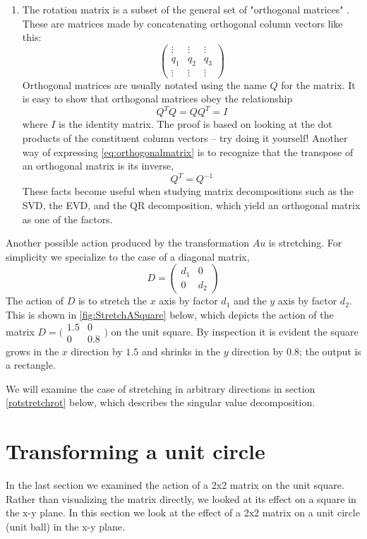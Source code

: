 \documentclass[onefignum,onetabnum]{siamart190516}
\begin{document}
\begin{enumerate}
	\item
	The rotation matrix is a subset of the general set of "orthogonal matrices" \cite{higham2020_OrthoMatrix}.  These
	are matrices made by concatenating orthogonal column vectors like this:
	$$
	\begin{pmatrix}
	\vdots & \vdots & \vdots \\
	q_1 & q_2 & q_3 \\
	\vdots & \vdots & \vdots
	\end{pmatrix}
	$$
	Orthogonal matrices are usually
	notated using the name $Q$ for the matrix.  It is easy to show that orthogonal matrices
	obey the relationship
	\begin{equation}
	Q^T Q = Q Q^T = I
	\label{eq:orthogonalmatrix}
	\end{equation}
	where $I$ is the identity matrix.  The proof is based on looking at the dot products
	of the constituent column vectors -- try doing it yourself!  
	Another way of expressing \cref{eq:orthogonalmatrix} is to recognize that the
	transpose of an orthogonal matrix is its inverse,
	$$
	Q^T = Q^{-1}
	$$
	These facts become useful when studying matrix decompositions such as the SVD, the EVD,
	and the QR decomposition, which yield an orthogonal matrix as one of the factors.
\end{enumerate}

Another possible action produced by the transformation $A u$ is stretching.
For simplicity we specialize to the case of a diagonal matrix,
\begin{equation}
D = 
\begin{pmatrix}
d_1 & 0 \\
0  & d_2
\end{pmatrix}
\end{equation}
The action of $D$ is to stretch the $x$ axis by factor $d_1$ and the
$y$ axis by factor $d_2$.  This is shown in \cref{fig:StretchASquare}
below, which depicts the action of the matrix 
$D = \bigl( \begin{smallmatrix} 1.5 & 0 \\ 0 & 0.8\end{smallmatrix}\bigr)$
on the unit square.  By inspection it is evident the square grows in the $x$ direction
by $1.5$ and shrinks in the $y$ direction by $0.8$; the output
is a rectangle.

We will examine the case of stretching in arbitrary directions in 
section \cref{rotstretchrot} below, which describes the singular value decomposition.

\section{Transforming a unit circle}
\label{sec:unit_ball}
In the last section we examined the action of a 2x2 matrix on the unit
square.  Rather than visualizing the matrix directly, we looked at its
effect on a square in the x-y plane.  In this section we look at the
effect of a 2x2 matrix on a unit circle (unit ball) in the x-y plane.
\end{document}
